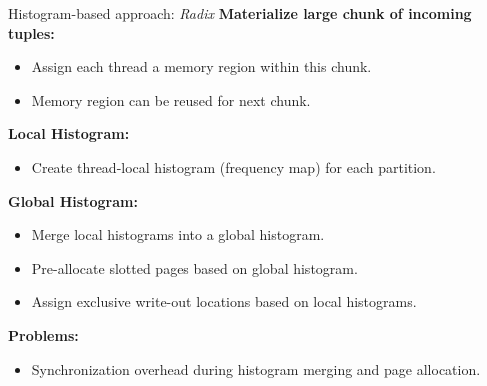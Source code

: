 \begin{frame}{Histogram-based approach: \emph{Radix}}
  \textbf{Materialize large chunk of incoming tuples:}
  \begin{itemize}
    \vspace{-1.5em}
    \item Assign each thread a memory region within this chunk.
    \item Memory region can be reused for next chunk.
  \end{itemize}
  \textbf{Local Histogram:}
  \begin{itemize}
    \vspace{-1.5em}
    \item Create thread-local histogram (frequency map) for each partition.
  \end{itemize}
  \textbf{Global Histogram:}
  \begin{itemize}
    \vspace{-1.5em}
    \item Merge local histograms into a global histogram.
    \item Pre-allocate slotted pages based on global histogram.
    \item Assign exclusive write-out locations based on local histograms.
  \end{itemize}
  \textbf{Problems:}
  \begin{itemize}
    \vspace{-1.5em}
    \item Synchronization overhead during histogram merging and page allocation.
  \end{itemize}
\end{frame}

